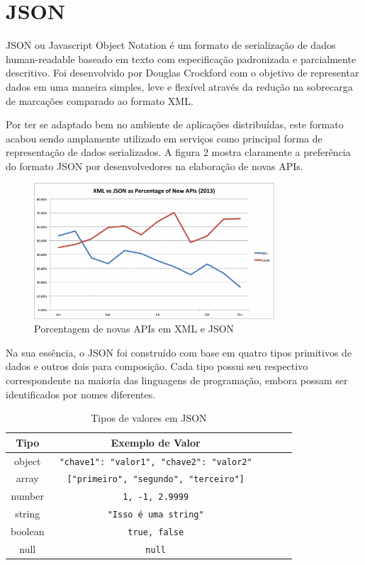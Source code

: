 \section{JSON}

JSON ou Javascript Object Notation é um formato de serialização de dados human-readable baseado em texto com especificação padronizada e parcialmente descritivo. Foi desenvolvido por Douglas Crockford com o objetivo de representar dados em uma maneira simples, leve e flexível através da redução na sobrecarga de marcações comparado ao formato XML.

Por ter se adaptado bem no ambiente de aplicações distribuídas, este formato acabou sendo amplamente utilizado em serviços como principal forma de representação de dados serializados. A figura 2 mostra claramente a preferência do formato JSON por desenvolvedores na elaboração de novas APIs. \cite{Duvander2013}

\begin{figure}[H]
  \centering
  \includegraphics[width=0.8\textwidth,height=\textheight,keepaspectratio]{figuras/xml-vs-json.png}
  \caption{Porcentagem de novas APIs em XML e JSON}
\end{figure}

Na sua essência, o JSON foi construído com base em quatro tipos primitivos de dados e outros dois para composição. Cada tipo possui seu respectivo correspondente na maioria das linguagens de programação, embora possam ser identificados por nomes diferentes. \cite{Droettboom2015}

\begin{table}[H]
  \centering
  \begin{tabular}{|c|c|c|c|c|}
    \hline
    Tipo & Exemplo de Valor \\
    \hline
    object & \texttt{ {"chave1": "valor1", "chave2": "valor2"} } \\
    \hline
    array & \texttt{ ["primeiro", "segundo", "terceiro"] } \\
    \hline
    number & \texttt{ 1, -1, 2.9999 } \\
    \hline
    string & \texttt{ "Isso é uma string" } \\
    \hline
    boolean & \texttt{ true, false } \\
    \hline
    null & \texttt{ null } \\
    \hline
  \end{tabular}
  \caption{Tipos de valores em JSON}
\end{table}

